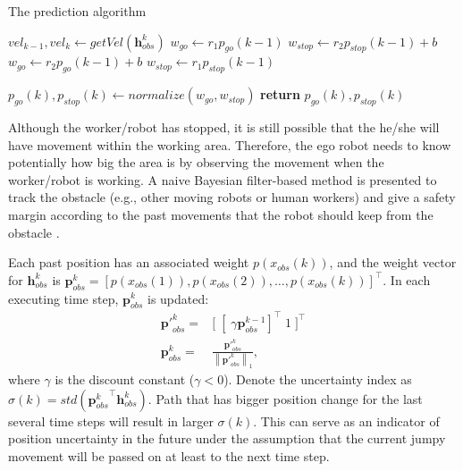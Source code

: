 \documentclass[letterpaper, 10 pt, conference]{ieeeconf}  %
\newcommand\norm[1]{\left\lVert#1\right\rVert}
\begin{document}
\begin{algorithm}
\caption{The prediction algorithm}\label{alg:euclid}
\begin{algorithmic}[1]
\State $vel_{k-1}, vel_{k} \gets getVel(\mathbf{h}_{obs}^k)$
    \State $w_{go} \gets r_1p_{go}(k-1)$
    \State $w_{stop} \gets r_2p_{stop}(k-1)+b$
\Else
    \State $w_{go} \gets r_2p_{go}(k-1)+b$
    \State $w_{stop} \gets r_1p_{stop}(k-1)$
    
\EndIf
\State $p_{go}(k), p_{stop}(k) \gets normalize(w_{go},w_{stop})$
\State \textbf{return} $p_{go}(k), p_{stop}(k)$
\EndProcedure
\end{algorithmic}
\end{algorithm}

Although the worker/robot has stopped, it is still possible that the he/she will have movement within the working area. Therefore, the ego robot needs to know potentially how big the area is by observing the movement when the worker/robot is working. A naive Bayesian filter-based method is presented to track the obstacle (e.g., other moving robots or human workers) and give a safety margin according to the past movements that the robot should keep from the obstacle .

Each past position has an associated weight $p(x_{obs}(k))$, and the weight vector for $\mathbf{h}_{obs}^k$ is $\mathbf{p}_{obs}^k = [p(x_{obs}(1)), p(x_{obs}(2)),\ldots, p(x_{obs}(k))]^\top$. In each executing time step, $\mathbf{p}_{obs}^k$ is updated:
\begin{equation}
\begin{split}
\mathbf{p'}_{obs}^k =& \big[\;[\;\gamma\mathbf{p}_{obs}^{k-1}]^\top \;1\; \big]^\top \\
\mathbf{p}_{obs}^k =& \frac{\mathbf{p'}_{obs}^k}{\norm{ \mathbf{p'}_{obs}^k }_1},
\end{split}
\end{equation}
where $\gamma$ is the discount constant ($\gamma < 0 $). Denote the uncertainty index as $\sigma(k) = std({\mathbf{p}_{obs}^k}^\top \mathbf{h}_{obs}^k)$. Path that has bigger position change for the last several time steps will result in larger $\sigma(k)$. This can serve as an indicator of position uncertainty in the future under the assumption that the current jumpy movement will be passed on at least to the next time step.  
\end{document}

